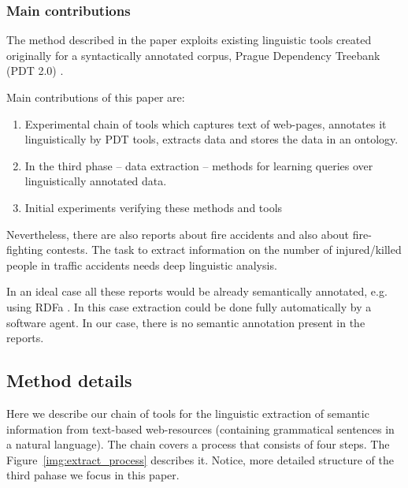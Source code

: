 \subsubsection{Main contributions}

The method described in the paper exploits existing linguistic tools created originally for a syntactically annotated corpus, Prague Dependency Treebank (PDT 2.0) \cite{biblio:PDT20_CD}.

Main contributions of this paper are: 
 
\begin{enumerate}
\item  Experimental chain of tools which captures text of web-pages, annotates it linguistically by PDT tools, extracts data and stores the data in an ontology. %
\item  In the third phase -- data extraction -- methods for learning queries over linguistically annotated data. 
\item Initial experiments verifying these methods and tools
\end{enumerate}
 
Nevertheless, there are also reports about fire accidents and also about fire-fighting contests. The task to extract information on the number of injured/killed people in traffic accidents needs deep linguistic analysis.

In an ideal case all these reports would be already semantically annotated, e.g. using RDFa \cite{biblio:RDFa}. In this case extraction could be done fully automatically by a software agent. In our case, there is no semantic annotation present in the reports.





\subsection{Method details}

Here we describe our chain of tools for the linguistic extraction of semantic information from text-based web-resources (containing grammatical sentences in a natural language). The chain covers a process that consists of four steps. The Figure~\ref{img:extract_process} describes it. Notice, more detailed structure of the third pahase we focus in this paper.


